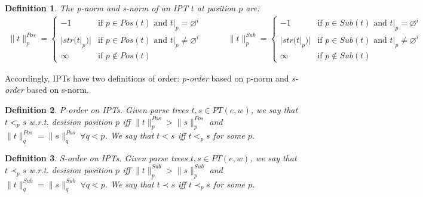 \documentclass[AMA,STIX1COL]{WileyNJD-v2}
\newcommand{\pnorm}[2]{\|{#1}\|^{Pos}_{#2}}
\newcommand{\snorm}[2]{\|{#1}\|^{Sub}_{#2}}
\newtheorem{Xdef}{Definition}
\begin{document}
    \begin{Xdef}\label{tnorm_of_IPTs}
    The \emph{p-norm} and \emph{s-norm} of an IPT $t$ at position $p$ are:
    \begin{align*}
        \pnorm{t}{p} =
            \begin{cases}
                -1          &\text{if } p \in Pos(t) \text{ and } t|_p = \varnothing^i  \\
                |str(t|_p)| &\text{if } p \in Pos(t) \text{ and } t|_p \neq \varnothing^i \\
                \infty      &\text{if } p \not\in Pos(t)
            \end{cases}
    \quad\quad\quad
        \snorm{t}{p} =
            \begin{cases}
                -1          &\text{if } p \in Sub(t) \text{ and } t|_p = \varnothing^i  \\
                |str(t|_p)| &\text{if } p \in Sub(t) \text{ and } t|_p \neq \varnothing^i \\
                \infty      &\text{if } p \not\in Sub(t)
            \end{cases}
    \end{align*}
    \end{Xdef}


Accordingly, IPTs have two definitions of order:
\emph{p-order} based on p-norm
and \emph{s-order} based on s-norm.

    \begin{Xdef}\label{total_order_on_IPTs}
    \emph{P-order on IPTs.}
    Given parse trees $t, s \in PT(e, w)$, we say that $t <_p s$ w.r.t. \emph{desision position} $p$
    iff $\pnorm{t}{p} > \pnorm{s}{p}$ and $\pnorm{t}{q} = \pnorm{s}{q} \; \forall q < p$.
    We say that $t < s$ iff $t <_p s$ for some $p$.
    \end{Xdef}

    \begin{Xdef}\label{partial_order_on_IPTs}
    \emph{S-order on IPTs.}
    Given parse trees $t, s \in PT(e, w)$, we say that $t \prec_p s$ w.r.t. \emph{desision position} $p$ %
    iff $\snorm{t}{p} > \snorm{s}{p}$ and $\snorm{t}{q} = \snorm{s}{q} \; \forall q < p$.
    We say that $t \prec s$ iff $t \prec_p s$ for some $p$.
    \end{Xdef}
\end{document}
